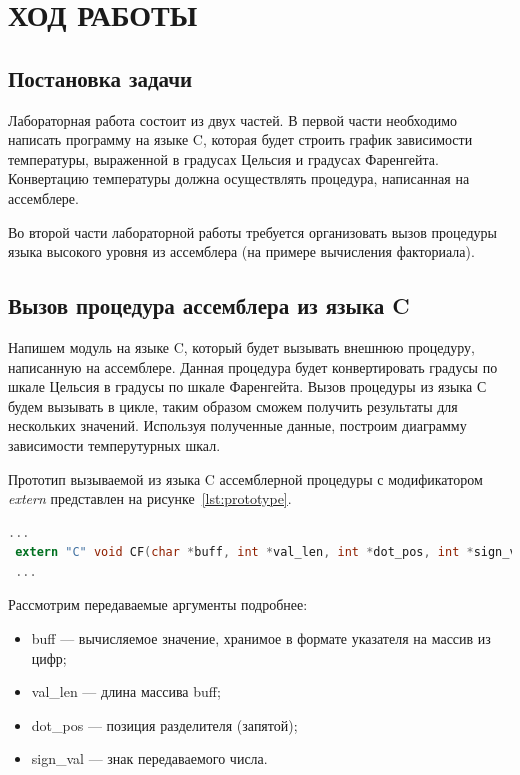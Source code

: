\section{ХОД РАБОТЫ}

\subsection{Постановка задачи}

Лабораторная работа состоит из двух частей. В первой части необходимо написать
программу на языке C, которая будет строить график зависимости температуры,
выраженной в градусах Цельсия и градусах Фаренгейта. Конвертацию температуры
должна осуществлять процедура, написанная на ассемблере.

Во второй части лабораторной работы требуется организовать вызов процедуры
языка высокого уровня из ассемблера (на примере вычисления факториала).

\subsection{Вызов процедура ассемблера из языка C}

Напишем модуль на языке C, который будет вызывать внешнюю процедуру, написанную
на ассемблере. Данная процедура будет конвертировать градусы по шкале Цельсия в
градусы по шкале Фаренгейта. Вызов процедуры из языка С будем вызывать в цикле,
таким образом сможем получить результаты для нескольких значений. Используя
полученные данные, построим диаграмму зависимости темперутурных шкал.

Прототип вызываемой из языка C ассемблерной процедуры с модификатором
\textit{extern} представлен на рисунке~\ref{lst:prototype}.
\begin{lstlisting}[caption=Прототип функции CF,
label=lst:prototype,language={C},basicstyle=\scriptsize\ttfamily]
 ...
 extern "C" void CF(char *buff, int *val_len, int *dot_pos, int *sign_val);
 ...
\end{lstlisting}

Рассмотрим передаваемые аргументы подробнее:

\begin{itemize}

  \item buff --- вычисляемое значение, хранимое в формате указателя на массив из цифр;
  \item val\_len --- длина массива buff;
  \item dot\_pos --- позиция разделителя (запятой);
  \item sign\_val --- знак передаваемого числа.

\end{itemize}

